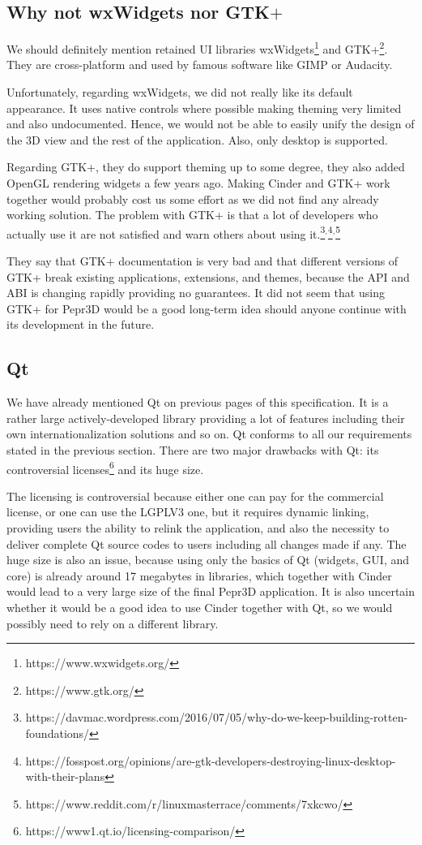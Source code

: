 \subsection{Why not wxWidgets nor GTK$+$}

We should definitely mention retained UI libraries wxWidgets\footnote{https://www.wxwidgets.org/} and GTK+\footnote{https://www.gtk.org/}.
They are cross-platform and used by famous software like GIMP or Audacity.

Unfortunately, regarding wxWidgets, we did not really like its default appearance.
It uses native controls where possible making theming very limited and also undocumented.
Hence, we would not be able to easily unify the design of the 3D view and the rest of the application.
Also, only desktop is supported.

Regarding GTK+, they do support theming up to some degree, they also added OpenGL rendering widgets a few years ago.
Making Cinder and GTK+ work together would probably cost us some effort as we did not find any already working solution.
The problem with GTK+ is that a lot of developers who actually use it are not satisfied and warn others about using it.\footnote{https://davmac.wordpress.com/2016/07/05/why-do-we-keep-building-rotten-foundations/}$^{,}$\footnote{https://fosspost.org/opinions/are-gtk-developers-destroying-linux-desktop-with-their-plans}$^{,}$\footnote{https://www.reddit.com/r/linuxmasterrace/comments/7xkcwo/}

They say that GTK+ documentation is very bad and that different versions of GTK+ break existing applications, extensions, and themes, because the API and ABI is changing rapidly providing no guarantees.
It did not seem that using GTK+ for Pepr3D would be a good long-term idea should anyone continue with its development in the future.

\subsection{Qt}

We have already mentioned Qt on previous pages of this specification.
It is a rather large actively-developed library providing a lot of features including their own internationalization solutions and so on.
Qt conforms to all our requirements stated in the previous section.
There are two major drawbacks with Qt: its controversial licenses\footnote{https://www1.qt.io/licensing-comparison/} and its huge size.

The licensing is controversial because either one can pay for the commercial license, or one can use the LGPLV3 one, but it requires dynamic linking, providing users the ability to relink the application, and also the necessity to deliver complete Qt source codes to users including all changes made if any.
The huge size is also an issue, because using only the basics of Qt (widgets, GUI, and core) is already around 17 megabytes in libraries, which together with Cinder would lead to a very large size of the final Pepr3D application.
It is also uncertain whether it would be a good idea to use Cinder together with Qt, so we would possibly need to rely on a different library.

